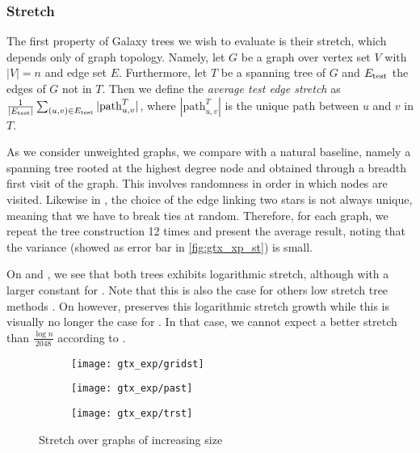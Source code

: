 \subsubsection{Stretch}

The first property of Galaxy trees we wish to evaluate is their stretch, which depends only of graph
topology. Namely, let $G$ be a graph over vertex set $V$ with $|V|=n$ and edge set
$E$. Furthermore, let $T$ be a
spanning tree of $G$ and $E_{\mathrm{test}}{}$ the edges of $G$ not in $T$. Then we define the \emph{average
test edge stretch} as $\frac{1}{|E_{\mathrm{test}}{}|} \sum_{(u,v) \in E_{\mathrm{test}}{}} |\mathrm{path}^T_{u,v}|$,
where $|\mathrm{path}^T_{u,v}|$ is the unique path between $u$ and $v$ in $T$.

As we consider unweighted graphs, we compare \gtx{} with a natural baseline, namely a spanning tree
rooted at the highest degree node and obtained through a breadth first visit of the graph. This
involves randomness in order in which nodes are visited. Likewise in \gtx{}, the choice of the edge
linking two stars is not always unique, meaning that we have to break ties at random.  Therefore,
for each graph, we repeat the tree construction 12 times and present the average result, noting that
the variance (showed as error bar in \autoref{fig:gtx_xp_st}) is small.

On \lpa{} and \triangle{}, we see that both trees exhibits logarithmic stretch, although with a
larger constant for \gtx{}. Note that this is also the case for others low stretch tree methods
\autocite[\S 5.3.1]{papplow}. On \grid{} however, \gtx{} preserves this logarithmic stretch growth
while this is visually no longer the case for \bfs{}.
In that case, we cannot expect a better stretch than $\frac{\log n}{2048}$ according to
\autocite[Theorem 6.6]{LowerBound95}.

\begin{figure}[tbh]
	\centering
	\begin{subfigure}[b]{0.9\textwidth}
		\texttt{[image: gtx\_exp/gridst]}
		\caption{\grid{} }\label{fig:gtx_xp_gridst}
	\end{subfigure}

	\begin{subfigure}[b]{0.9\textwidth}
		\texttt{[image: gtx\_exp/past]}
		\caption{\lpa{} }\label{fig:gtx_xp_past}
	\end{subfigure}

	\begin{subfigure}[b]{0.9\textwidth}
		\texttt{[image: gtx\_exp/trst]}
		\caption{\triangle{} }\label{fig:gtx_xp_trst}
	\end{subfigure}
	\caption{Stretch over graphs of increasing size}\label{fig:gtx_xp_st}
\end{figure}

